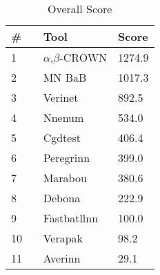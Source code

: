 

\begin{table}[h]
\begin{center}
\caption{Overall Score} \label{tab:score}
{\setlength{\tabcolsep}{2pt}
\begin{tabular}[h]{@{}lll@{}}
\toprule
\textbf{\# ~} & \textbf{Tool} & \textbf{Score}\\
\midrule
1 & $\alpha$,$\beta$-CROWN & 1274.9 \\
2 & MN BaB & 1017.3 \\
3 & Verinet & 892.5 \\
4 & Nnenum & 534.0 \\
5 & Cgdtest & 406.4 \\
6 & Peregrinn & 399.0 \\
7 & Marabou & 380.6 \\
8 & Debona & 222.9 \\
9 & Fastbatllnn & 100.0 \\
10 & Verapak & 98.2 \\
11 & Averinn & 29.1 \\
\bottomrule
\end{tabular}
}
\end{center}
\end{table}


